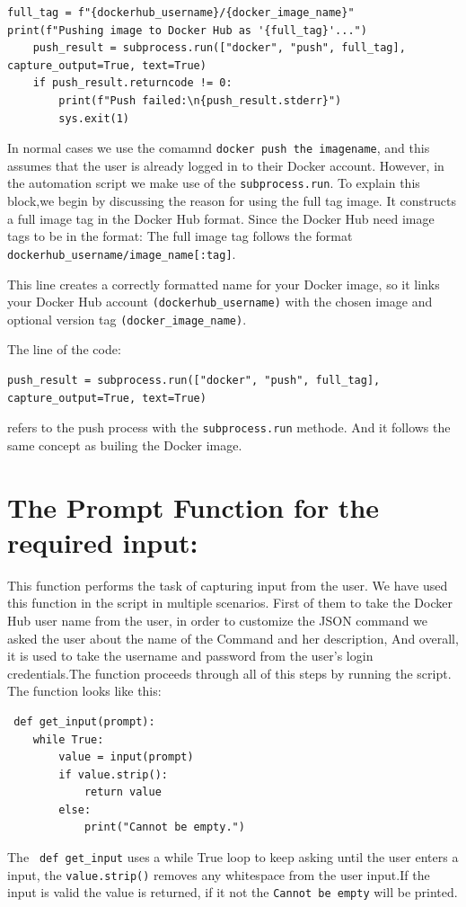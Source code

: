 \begin{lstlisting}
full_tag = f"{dockerhub_username}/{docker_image_name}"
print(f"Pushing image to Docker Hub as '{full_tag}'...")
    push_result = subprocess.run(["docker", "push", full_tag], capture_output=True, text=True)
    if push_result.returncode != 0:
        print(f"Push failed:\n{push_result.stderr}")
        sys.exit(1)

\end{lstlisting}

In normal cases we use the comamnd \texttt{docker push the imagename}, and this assumes that the user is already logged in to their Docker account. However, in the automation script we make use of the \texttt{subprocess.run}. 
To explain this block,we begin by discussing the reason for using the full tag image. It constructs a full image tag in the Docker Hub format. Since the Docker Hub need image tags  to be in the format: The full image tag follows the format \texttt{dockerhub\_username/image\_name[:tag]}.

This line creates a correctly formatted name for your Docker image, so it links your Docker Hub account \texttt{(dockerhub\_username)} with the chosen image and optional version tag \texttt{(docker\_image\_name)}.

The line of the code: 
\begin{lstlisting}
push_result = subprocess.run(["docker", "push", full_tag], capture_output=True, text=True)
\end{lstlisting}
refers to the push process with the \texttt{subprocess.run} methode. And it follows the same concept as builing the Docker image. 

\section{The Prompt Function for the required input:}

 This function performs the task of capturing input from the user.
 We have used this function in the script in multiple scenarios. First of them to take the Docker Hub user name from the user, in order to customize the JSON command we asked the user about the name of the Command and her description, And overall, it is used to take the username and password from the user's login credentials.The function proceeds through all of this steps by running the script.
 The function looks like this:\\
 \begin{lstlisting}
 def get_input(prompt):
    while True:
        value = input(prompt)
        if value.strip():
            return value
        else:
            print("Cannot be empty.")

\end{lstlisting}
The \texttt{ def get\_input} uses a while True loop to keep asking until the user enters a input, the \texttt{value.strip()} removes any whitespace from the user input.If the input is valid the value is returned, if it not the \texttt{Cannot be empty} will be printed.


